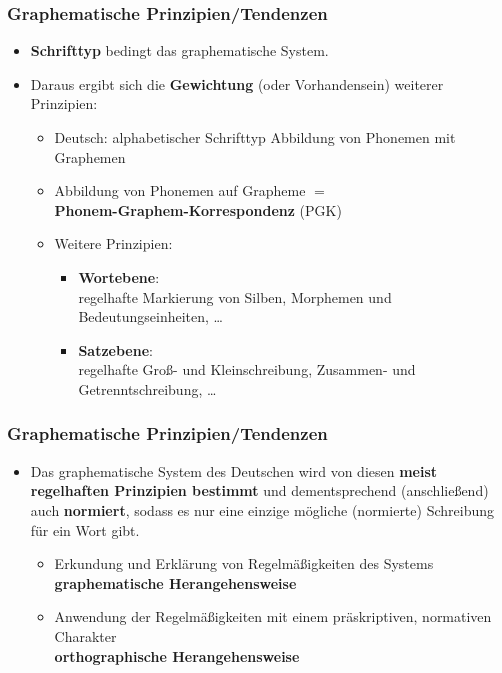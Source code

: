 \begin{frame}
\frametitle{Graphematische Prinzipien/Tendenzen}

\begin{itemize}
	\item \textbf{Schrifttyp} bedingt das graphematische System.
	\item Daraus ergibt sich die \textbf{Gewichtung} (oder Vorhandensein) weiterer
Prinzipien:

	\begin{itemize}
		\item Deutsch: alphabetischer Schrifttyp \ras Abbildung von Phonemen mit Graphemen

		\item Abbildung von Phonemen auf Grapheme $=$ \\
		\textbf{Phonem-Graphem-Korrespondenz} (PGK)
		
		\item Weitere Prinzipien:
		
		\begin{itemize}
			\item \textbf{Wortebene}:\\
			regelhafte Markierung von Silben, Morphemen und Bedeutungseinheiten, \dots

			\item \textbf{Satzebene}: \\
			regelhafte Groß- und Kleinschreibung, Zusammen- und Getrenntschreibung, \dots
		\end{itemize}
	
	\end{itemize}

\end{itemize}
\end{frame}


\begin{frame}
\frametitle{Graphematische Prinzipien/Tendenzen}

\begin{itemize}
	\item Das graphematische System des Deutschen wird von diesen
	\textbf{meist regelhaften Prinzipien bestimmt} und dementsprechend
	(anschließend) auch \textbf{normiert}, sodass es nur eine einzige
	mögliche (normierte) Schreibung für ein Wort gibt.
	
	\begin{itemize}
		\item Erkundung und Erklärung von Regelmäßigkeiten des Systems \\
		\ras \textbf{graphematische Herangehensweise}
		
		\item Anwendung der Regelmäßigkeiten mit einem präskriptiven,
		normativen Charakter \\
		\ras \textbf{orthographische Herangehensweise}
	\end{itemize}
\end{itemize}

\end{frame}


